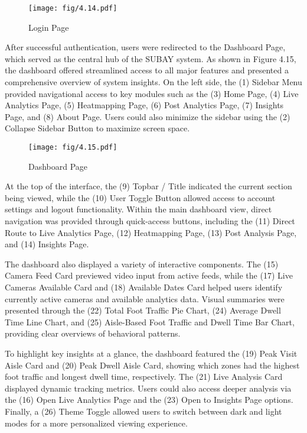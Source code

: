 {\begin{figure}[H]
	\caption[Login Page]{\newline \newline Login Page}
	\centering
	\texttt{[image: fig/4.14.pdf]}
	\label{fig:4.14}
\end{figure}

After successful authentication, users were redirected to the Dashboard Page, which served as the central hub of the SUBAY system. As shown in Figure 4.15, the dashboard offered streamlined access to all major features and presented a comprehensive overview of system insights. On the left side, the (1) Sidebar Menu provided navigational access to key modules such as the (3) Home Page, (4) Live Analytics Page, (5) Heatmapping Page, (6) Post Analytics Page, (7) Insights Page, and (8) About Page. Users could also minimize the sidebar using the (2) Collapse Sidebar Button to maximize screen space.

\begin{figure}[H]
	\caption[Dashboard Page]{\newline \newline Dashboard Page}
	\centering
	\texttt{[image: fig/4.15.pdf]}
	\label{fig:4.15}
\end{figure}

At the top of the interface, the (9) Topbar / Title indicated the current section being viewed, while the (10) User Toggle Button allowed access to account settings and logout functionality. Within the main dashboard view, direct navigation was provided through quick-access buttons, including the (11) Direct Route to Live Analytics Page, (12) Heatmapping Page, (13) Post Analysis Page, and (14) Insights Page.

The dashboard also displayed a variety of interactive components. The (15) Camera Feed Card previewed video input from active feeds, while the (17) Live Cameras Available Card and (18) Available Dates Card helped users identify currently active cameras and available analytics data. Visual summaries were presented through the (22) Total Foot Traffic Pie Chart, (24) Average Dwell Time Line Chart, and (25) Aisle-Based Foot Traffic and Dwell Time Bar Chart, providing clear overviews of behavioral patterns.

To highlight key insights at a glance, the dashboard featured the (19) Peak Visit Aisle Card and (20) Peak Dwell Aisle Card, showing which zones had the highest foot traffic and longest dwell time, respectively. The (21) Live Analysis Card displayed dynamic tracking metrics. Users could also access deeper analysis via the (16) Open Live Analytics Page and the (23) Open to Insights Page options. Finally, a (26) Theme Toggle allowed users to switch between dark and light modes for a more personalized viewing experience.

}
